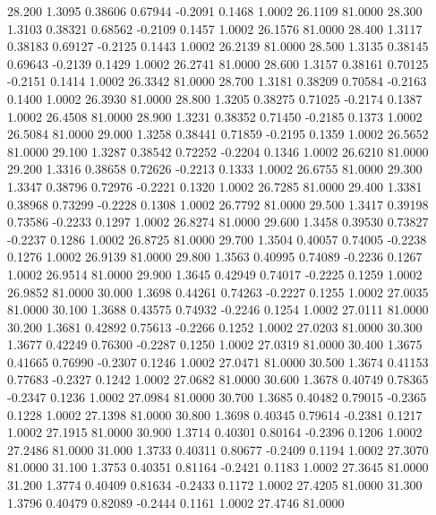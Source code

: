   28.200   1.3095   0.38606   0.67944  -0.2091   0.1468   1.0002  26.1109  81.0000
  28.300   1.3103   0.38321   0.68562  -0.2109   0.1457   1.0002  26.1576  81.0000
  28.400   1.3117   0.38183   0.69127  -0.2125   0.1443   1.0002  26.2139  81.0000
  28.500   1.3135   0.38145   0.69643  -0.2139   0.1429   1.0002  26.2741  81.0000
  28.600   1.3157   0.38161   0.70125  -0.2151   0.1414   1.0002  26.3342  81.0000
  28.700   1.3181   0.38209   0.70584  -0.2163   0.1400   1.0002  26.3930  81.0000
  28.800   1.3205   0.38275   0.71025  -0.2174   0.1387   1.0002  26.4508  81.0000
  28.900   1.3231   0.38352   0.71450  -0.2185   0.1373   1.0002  26.5084  81.0000
  29.000   1.3258   0.38441   0.71859  -0.2195   0.1359   1.0002  26.5652  81.0000
  29.100   1.3287   0.38542   0.72252  -0.2204   0.1346   1.0002  26.6210  81.0000
  29.200   1.3316   0.38658   0.72626  -0.2213   0.1333   1.0002  26.6755  81.0000
  29.300   1.3347   0.38796   0.72976  -0.2221   0.1320   1.0002  26.7285  81.0000
  29.400   1.3381   0.38968   0.73299  -0.2228   0.1308   1.0002  26.7792  81.0000
  29.500   1.3417   0.39198   0.73586  -0.2233   0.1297   1.0002  26.8274  81.0000
  29.600   1.3458   0.39530   0.73827  -0.2237   0.1286   1.0002  26.8725  81.0000
  29.700   1.3504   0.40057   0.74005  -0.2238   0.1276   1.0002  26.9139  81.0000
  29.800   1.3563   0.40995   0.74089  -0.2236   0.1267   1.0002  26.9514  81.0000
  29.900   1.3645   0.42949   0.74017  -0.2225   0.1259   1.0002  26.9852  81.0000
  30.000   1.3698   0.44261   0.74263  -0.2227   0.1255   1.0002  27.0035  81.0000
  30.100   1.3688   0.43575   0.74932  -0.2246   0.1254   1.0002  27.0111  81.0000
  30.200   1.3681   0.42892   0.75613  -0.2266   0.1252   1.0002  27.0203  81.0000
  30.300   1.3677   0.42249   0.76300  -0.2287   0.1250   1.0002  27.0319  81.0000
  30.400   1.3675   0.41665   0.76990  -0.2307   0.1246   1.0002  27.0471  81.0000
  30.500   1.3674   0.41153   0.77683  -0.2327   0.1242   1.0002  27.0682  81.0000
  30.600   1.3678   0.40749   0.78365  -0.2347   0.1236   1.0002  27.0984  81.0000
  30.700   1.3685   0.40482   0.79015  -0.2365   0.1228   1.0002  27.1398  81.0000
  30.800   1.3698   0.40345   0.79614  -0.2381   0.1217   1.0002  27.1915  81.0000
  30.900   1.3714   0.40301   0.80164  -0.2396   0.1206   1.0002  27.2486  81.0000
  31.000   1.3733   0.40311   0.80677  -0.2409   0.1194   1.0002  27.3070  81.0000
  31.100   1.3753   0.40351   0.81164  -0.2421   0.1183   1.0002  27.3645  81.0000
  31.200   1.3774   0.40409   0.81634  -0.2433   0.1172   1.0002  27.4205  81.0000
  31.300   1.3796   0.40479   0.82089  -0.2444   0.1161   1.0002  27.4746  81.0000
